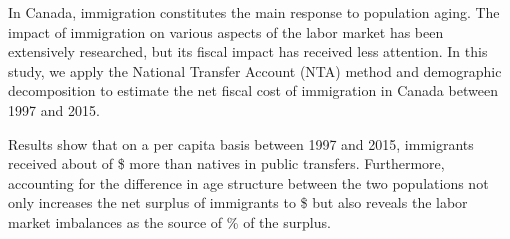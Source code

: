 In Canada, immigration constitutes the main response to population aging.
The impact of immigration on various aspects of the labor market has been extensively researched, but its fiscal impact has received less attention.
In this study, we apply the National Transfer Account (NTA) method and demographic decomposition to estimate the net fiscal cost of immigration in Canada between 1997 and 2015.

\vspace{0.7em}\par
Results show that on a per capita basis between 1997 and 2015, immigrants received about of \$ more than natives in public transfers.
Furthermore, accounting for the difference in age structure between the two populations not only increases the net surplus of immigrants to \$ but also reveals the labor market imbalances as the source of \% of the surplus.